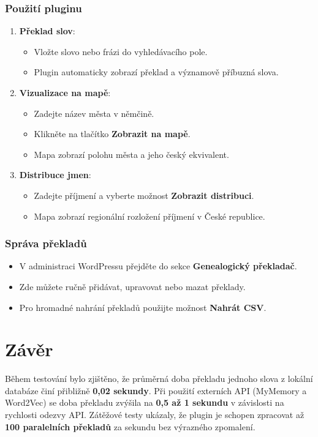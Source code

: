 \documentclass[czech, ba, kiv, he]{fasthesis}
\begin{document}
\subsection{Použití pluginu}
\begin{enumerate}
    \item \textbf{Překlad slov}:
    \begin{itemize}
        \item Vložte slovo nebo frázi do vyhledávacího pole.
        \item Plugin automaticky zobrazí překlad a významově příbuzná slova.
    \end{itemize}
    \item \textbf{Vizualizace na mapě}:
    \begin{itemize}
        \item Zadejte název města v němčině.
        \item Klikněte na tlačítko \textbf{Zobrazit na mapě}.
        \item Mapa zobrazí polohu města a jeho český ekvivalent.
    \end{itemize}
    \item \textbf{Distribuce jmen}:
    \begin{itemize}
        \item Zadejte příjmení a vyberte možnost \textbf{Zobrazit distribuci}.
        \item Mapa zobrazí regionální rozložení příjmení v České republice.
    \end{itemize}
\end{enumerate}

\subsection{Správa překladů}
\begin{itemize}
    \item V administraci WordPressu přejděte do sekce \textbf{Genealogický překladač}.
    \item Zde můžete ručně přidávat, upravovat nebo mazat překlady.
    \item Pro hromadné nahrání překladů použijte možnost \textbf{Nahrát CSV}.
\end{itemize}

\chapter{Závěr}

Během testování bylo zjištěno, že průměrná doba překladu jednoho slova z lokální databáze činí přibližně \textbf{0,02 sekundy}. Při použití externích API (MyMemory a Word2Vec) se doba překladu zvýšila na \textbf{0,5 až 1 sekundu} v závislosti na rychlosti odezvy API. Zátěžové testy ukázaly, že plugin je schopen zpracovat až \textbf{100 paralelních překladů} za sekundu bez výrazného zpomalení.
\end{document}
